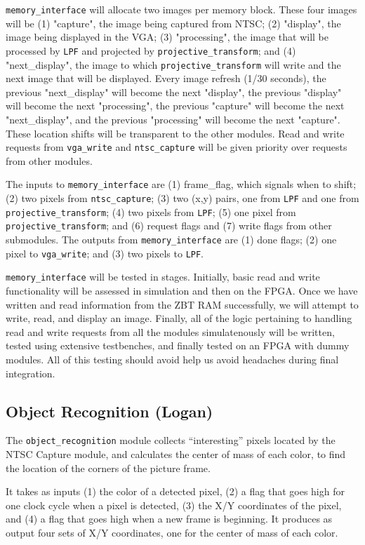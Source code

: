 \documentclass[10pt]{article}
\begin{document}
{\tt memory\_interface} will allocate two images per memory block. These four images will be (1) "capture", the image being captured from NTSC; (2) "display", the image being displayed in the VGA; (3) "processing", the image that will be processed by {\tt LPF} and projected by {\tt projective\_transform}; and (4) "next\_display", the image to which {\tt projective\_transform} will write and the next image that will be displayed. Every image refresh (1/30 seconds), the previous "next\_display" will become the next "display", the previous "display" will become the next "processing", the previous "capture" will become the next "next\_display", and the previous "processing" will become the next "capture". These location shifts will be transparent to the other modules. Read and write requests from {\tt vga\_write} and {\tt ntsc\_capture} will be given priority over requests from other modules.

The inputs to {\tt memory\_interface} are (1) frame\_flag, which signals when to shift; (2) two pixels from {\tt ntsc\_capture}; (3) two (x,y) pairs, one from {\tt LPF} and one from {\tt projective\_transform}; (4) two pixels from {\tt LPF}; (5) one pixel from {\tt projective\_transform}; and (6) request flags and (7) write flags from other submodules. The outputs from {\tt memory\_interface} are (1) done flags; (2) one pixel to {\tt vga\_write}; and (3) two pixels to {\tt LPF}.

{\tt memory\_interface} will be tested in stages. Initially, basic read and write functionality will be assessed in simulation and then on the FPGA. Once we have written and read information from the ZBT RAM successfully, we will attempt to write, read, and display an image. Finally, all of the logic pertaining to handling read and write requests from all the modules simulatenously will be written, tested using extensive testbenches, and finally tested on an FPGA with dummy modules. All of this testing should avoid help us avoid headaches during final integration.

\subsection{Object Recognition (Logan)}
The {\tt object\_recognition} module collects ``interesting'' pixels located by the NTSC Capture module, and calculates the center of mass of each color, to find the location of the corners of the picture frame.

It takes as inputs (1) the color of a detected pixel, (2) a flag that goes high for one clock cycle when a pixel is detected, (3) the X/Y coordinates of the pixel, and (4) a flag that goes high when a new frame is beginning. It produces as output four sets of X/Y coordinates, one for the center of mass of each color.
\end{document}
